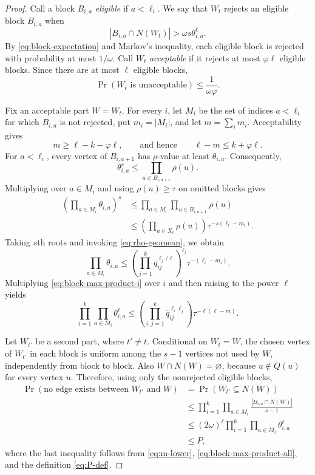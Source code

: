 \documentclass{article}
\begin{document}
\begin{proof}
Call a block $B_{i,a}$ \emph{eligible} if $a<\ell_i$.  We say that $W_t$ rejects an eligible block $B_{i,a}$ when
\[
 |B_{i,a}\cap N(W_t)|>\omega s\theta_{i,a}^{\ell}.
\]
By \eqref{eq:block-expectation} and Markov's inequality, each eligible block is rejected with probability at most $1/\omega$.  Call $W_t$ \emph{acceptable} if it rejects at most $\varphi\ell$ eligible blocks.  Since there are at most $\ell$ eligible blocks,
\begin{equation}\label{eq:unacceptable-prob}
 \Pr(W_t\text{ is unacceptable})\le\frac1{\omega\varphi}.
\end{equation}

Fix an acceptable part $W=W_t$.  For every $i$, let $M_i$ be the set of indices $a<\ell_i$ for which $B_{i,a}$ is not rejected, put $m_i=|M_i|$, and let $m=\sum_i m_i$.  Acceptability gives
\begin{equation}\label{eq:m-lower}
 m\ge \ell-k-\varphi\ell,
 \qquad\text{and hence}\qquad
 \ell-m\le k+\varphi\ell.
\end{equation}
For $a<\ell_i$, every vertex of $B_{i,a+1}$ has $\rho$-value at least $\theta_{i,a}$.  Consequently,
\[
 \theta_{i,a}^{s}\le\prod_{u\in B_{i,a+1}}\rho(u).
\]
Multiplying over $a\in M_i$ and using $\rho(u)\ge\tau$ on omitted blocks gives
\begin{align*}
 \left(\prod_{a\in M_i}\theta_{i,a}\right)^s
 &\le \prod_{a\in M_i}\prod_{u\in B_{i,a+1}}\rho(u)\\
 &\le \left(\prod_{u\in X_i}\rho(u)\right)
 \tau^{-s(\ell_i-m_i)}.
\end{align*}
Taking $s$th roots and invoking \eqref{eq:rho-geomean}, we obtain
\begin{equation}\label{eq:block-max-product-i}
 \prod_{a\in M_i}\theta_{i,a}
 \le
 \left(\prod_{j=1}^k\overline q_{ij}^{\ell_j/\ell}\right)^{\ell_i}
 \tau^{-(\ell_i-m_i)}.
\end{equation}
Multiplying \eqref{eq:block-max-product-i} over $i$ and then raising to the power $\ell$ yields
\begin{equation}\label{eq:block-max-product-all}
 \prod_{i=1}^k\prod_{a\in M_i}\theta_{i,a}^{\ell}
 \le
 \left(\prod_{i,j=1}^k\overline q_{ij}^{\ell_i\ell_j}\right)
 \tau^{-\ell(\ell-m)}.
\end{equation}

Let $W_{t'}$ be a second part, where $t'\ne t$.  Conditional on $W_t=W$, the chosen vertex of $W_{t'}$ in each block is uniform among the $s-1$ vertices not used by $W$, independently from block to block.  Also $W\cap N(W)=\varnothing$, because $u\notin Q(u)$ for every vertex $u$.  Therefore, using only the nonrejected eligible blocks,
\begin{align*}
 \Pr(\text{no edge exists between $W_{t'}$ and $W$})
 &=\Pr(W_{t'}\subseteq N(W))\\
 &\le\prod_{i=1}^k\prod_{a\in M_i}
 \frac{|B_{i,a}\cap N(W)|}{s-1}\\
 &\le (2\omega)^\ell
 \prod_{i=1}^k\prod_{a\in M_i}\theta_{i,a}^{\ell}\\
 &\le P,
\end{align*}
where the last inequality follows from \eqref{eq:m-lower}, \eqref{eq:block-max-product-all}, and the definition \eqref{eq:P-def}.


\end{proof}
\end{document}
